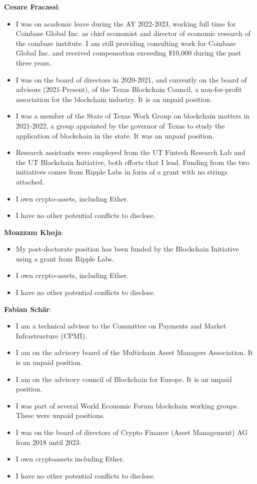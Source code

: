\documentclass[No]{AEA}
\begin{document}
\vspace{2cm}
\textbf{Cesare Fracassi}: 
\begin{itemize}
    \item I was on academic leave during the AY 2022-2023, working full time for Coinbase Global Inc. as chief economist and director of economic research of the coinbase institute. I am still providing consulting work for Coinbase Global Inc. and received compensation exceeding \$10,000 during the past three years.
    \item I was on the board of directors in 2020-2021, and currently on the board of advisors (2021-Present), of the Texas Blockchain Council, a non-for-profit association for the blockchain industry. It is an unpaid position. 
    \item I was a member of the State of Texas Work Group on blockchain matters in 2021-2022, a group appointed by the governor of Texas to study the application of blockchain in the state. It was an unpaid position. 
    \item Research assistants were employed from the UT Fintech Research Lab and the UT Blockchain Initiative, both efforts that I lead. Funding from the two initiatives comes from Ripple Labs in form of a grant with no strings attached. 
    \item I own crypto-assets, including Ether. 
    \item I have no other potential conflicts to disclose.
\end{itemize}

\textbf{Moazzam Khoja}: 
\begin{itemize}
    \item My post-doctorate position has been funded by the Blockchain Initiative using a grant from Ripple Labs. 
    \item I own crypto-assets, including Ether. 
    \item I have no other potential conflicts to disclose.
\end{itemize}
    
\textbf{Fabian Sch\"{a}r}: 
\begin{itemize}
    \item I am a technical advisor to the Committee on Payments and Market Infrastructure (CPMI).
    \item I am on the advisory board of the Multichain Asset Managers Association. It is an unpaid position.
    \item I am on the advisory council of Blockchain for Europe. It is an unpaid position.
    \item I was part of several World Economic Forum blockchain working groups. These were unpaid positions.
    \item I was on the board of directors of Crypto Finance (Asset Management) AG from 2018 until 2023.
    \item I own cryptoassets including Ether.
    \item I have no other potential conflicts to disclose.
\end{itemize}
\end{document}
